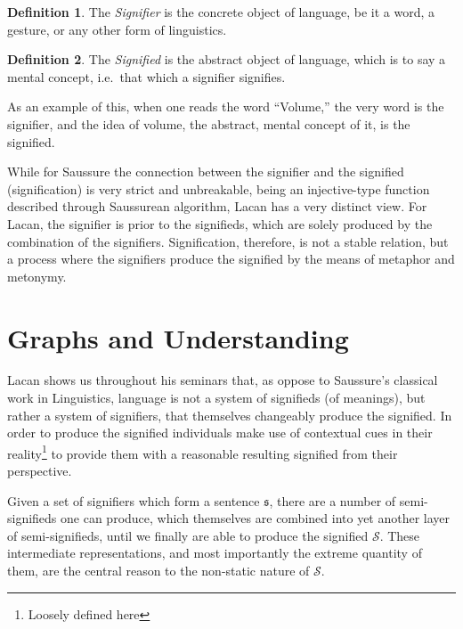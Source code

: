 \documentclass[11pt,letterpaper]{article}
\theoremstyle{definition}
\newtheorem{defn}{Definition}[section]
\begin{document}
\begin{defn}\label{def:signifier}
    The \emph{Signifier} is the concrete object of language, be it a word, a gesture, or any other form of linguistics.\autocite{berger_2013}
\end{defn}
\begin{defn}\label{def:signified}
    The \emph{Signified} is the abstract object of language, which is to say a mental concept, i.e.\ that which a signifier signifies.\autocite{berger_2013}
\end{defn}
As an example of this, when one reads the word ``Volume,'' the very word is the signifier, and the idea of volume, the abstract, mental concept of it, is the signified.

While for Saussure the connection between the signifier and the signified (signification) is very strict and unbreakable, being an injective-type function described through Saussurean algorithm, Lacan has a very distinct view. For Lacan, the signifier is prior to the signifieds, which are solely produced by the combination of the signifiers. Signification, therefore, is not a stable relation, but a process where the signifiers produce the signified by the means of metaphor and metonymy.\autocite{lacan_miller_2000}

\newpage
\section{Graphs and Understanding}

Lacan shows us throughout his seminars that, as oppose to Saussure's classical work in Linguistics, language is not a system of signifieds (of meanings), but rather a system of signifiers, that themselves changeably produce the signified. In order to produce the signified individuals make use of contextual cues in their reality\footnote{Loosely defined here} to provide them with a reasonable resulting signified from their perspective.

Given a set of signifiers which form a sentence \(\mathfrak{s}\), there are a number of semi-signifieds one can produce, which themselves are combined into yet another layer of semi-signifieds, until we finally are able to produce the signified \(\mathscr{S}\). These intermediate representations, and most importantly the extreme quantity of them, are the central reason to the non-static nature of \(\mathscr{S}\).
\end{document}
